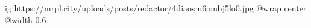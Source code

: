  
 
 
 
 

\ifcmt
  ig https://mrpl.city/uploads/posts/redactor/4diaosm6ombj5lo0.jpg
  @wrap center
  @width 0.6
\fi
